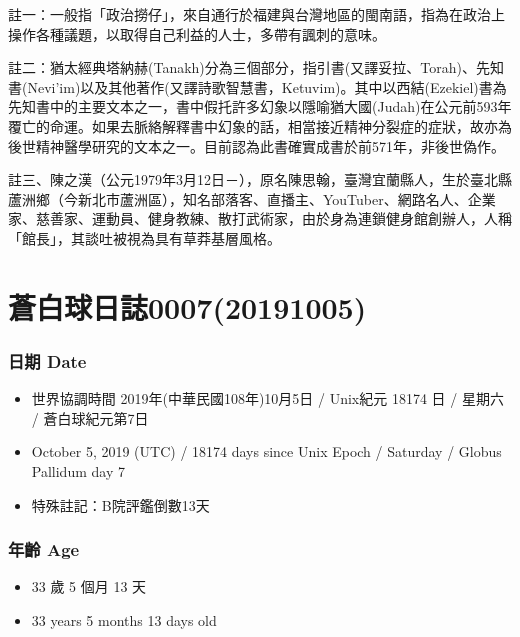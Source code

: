 \documentclass[a5paper, 12pt
]{book}
\providecommand{\tightlist}{%
  \setlength{\itemsep}{0pt}\setlength{\parskip}{0pt}}
\begin{document}
註一：一般指「政治撈仔」，來自通行於福建與台灣地區的閩南語，指為在政治上操作各種議題，以取得自己利益的人士，多帶有諷刺的意味。

註二：猶太經典塔納赫(Tanakh)分為三個部分，指引書(又譯妥拉、Torah)、先知書(Nevi'im)以及其他著作(又譯詩歌智慧書，Ketuvim)。其中以西結(Ezekiel)書為先知書中的主要文本之一，書中假托許多幻象以隱喻猶大國(Judah)在公元前593年覆亡的命運。如果去脈絡解釋書中幻象的話，相當接近精神分裂症的症狀，故亦為後世精神醫學研究的文本之一。目前認為此書確實成書於前571年，非後世偽作。

註三、陳之漢（公元1979年3月12日－），原名陳思翰，臺灣宜蘭縣人，生於臺北縣蘆洲鄉（今新北市蘆洲區），知名部落客、直播主、YouTuber、網路名人、企業家、慈善家、運動員、健身教練、散打武術家，由於身為連鎖健身館創辦人，人稱「館長」，其談吐被視為具有草莽基層風格。

\hypertarget{ux84bcux767dux7403ux65e5ux8a8c000720191005}{%
\section{蒼白球日誌0007(20191005)}\label{ux84bcux767dux7403ux65e5ux8a8c000720191005}}

\hypertarget{ux65e5ux671f-date-6}{%
\subsubsection{日期 Date}\label{ux65e5ux671f-date-6}}

\begin{itemize}
\tightlist
\item
  世界協調時間 2019年(中華民國108年)10月5日 / Unix紀元 18174 日 / 星期六
  / 蒼白球紀元第7日
\item
  October 5, 2019 (UTC) / 18174 days since Unix Epoch / Saturday /
  Globus Pallidum day 7
\item
  特殊註記：B院評鑑倒數13天
\end{itemize}

\hypertarget{ux5e74ux9f61-age-6}{%
\subsubsection{年齡 Age}\label{ux5e74ux9f61-age-6}}

\begin{itemize}
\tightlist
\item
  33 歲 5 個月 13 天
\item
  33 years 5 months 13 days old
\end{itemize}
\end{document}
